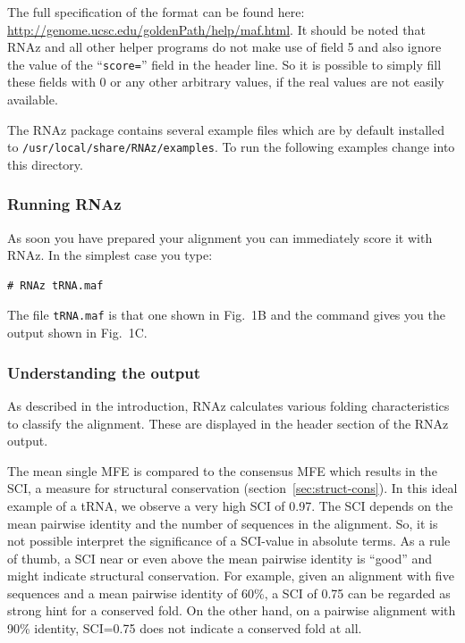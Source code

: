\documentclass[11pt]{article}
\begin{document}
The full specification of the format can be found here:
\url{http://genome.ucsc.edu/goldenPath/help/maf.html}. It should be noted
that RNAz and all other helper programs do not make use of field 5 and also
ignore the value of the ``\texttt{score=}'' field in the header line. So it
is possible to simply fill these fields with 0 or any other arbitrary
values, if the real values are not easily available.

The RNAz package contains several example files which are by
default installed to \texttt{/usr/local/share/RNAz/examples}. To run the
following examples change into this directory.

\subsubsection{Running RNAz}

As soon you have prepared your alignment you can immediately score it with
RNAz. In the simplest case you type:

\begin{verbatim}
# RNAz tRNA.maf
\end{verbatim}

The file \texttt{tRNA.maf} is that one shown in Fig.~1B and the command
gives you the output shown in Fig.~1C.

\subsubsection{Understanding the output}
\label{sec:understanding-output}

As described in the introduction, RNAz calculates various folding
characteristics to classify the alignment. These are displayed in the
header section of the RNAz output.

The mean single MFE is compared to the consensus MFE which results in the
SCI, a measure for structural conservation (section~\ref{sec:struct-cons}).
In this ideal example of a tRNA, we observe a very high SCI of 0.97. The
SCI depends on the mean pairwise identity and the number of sequences in
the alignment.  So, it is not possible interpret the significance of a
SCI-value in absolute terms.  As a rule of thumb, a SCI near or even above
the mean pairwise identity is ``good'' and might indicate structural
conservation.  For example, given an alignment with five sequences and a
mean pairwise identity of 60\%, a SCI of 0.75 can be regarded as strong
hint for a conserved fold. On the other hand, on a pairwise alignment with
90\% identity, SCI=0.75 does not indicate a conserved fold at all.
\end{document}
